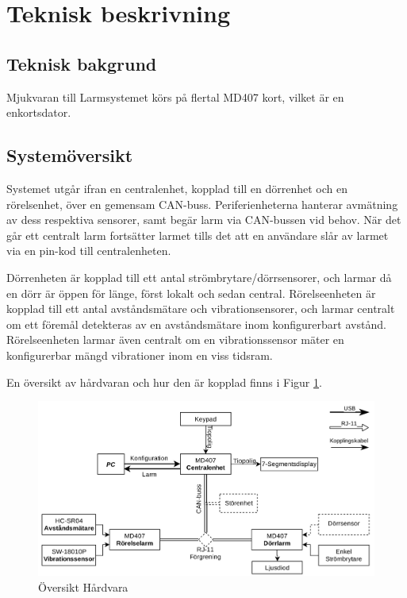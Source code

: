 \documentclass{article}
\begin{document}
\section{Teknisk beskrivning} %
\subsection{Teknisk bakgrund}
Mjukvaran till Larmsystemet körs på flertal MD407 kort, vilket är en
enkortsdator.
\subsection{Systemöversikt}

Systemet utgår ifran en centralenhet, kopplad till en dörrenhet och en rörelsenhet, över en gemensam CAN-buss. Periferienheterna hanterar avmätning av dess respektiva sensorer, samt begär larm via CAN-bussen vid behov. När det går ett centralt larm fortsätter larmet tills det att en användare slår av larmet via en pin-kod till centralenheten.

Dörrenheten är kopplad till ett antal strömbrytare/dörrsensorer, och larmar då en dörr är öppen för länge, först lokalt och sedan central.
Rörelseenheten är kopplad till ett antal avståndsmätare och vibrationsensorer, och larmar centralt om ett föremål detekteras av en avståndsmätare inom konfigurerbart avstånd. Rörelseenheten larmar även centralt om en vibrationssensor mäter en konfigurerbar mängd vibrationer inom en viss tidsram. %

En översikt av hårdvaran och hur den är kopplad finns i Figur \ref{fig:hårdvara}.
\begin{figure}[H] %
    \centering
    \includegraphics[width=1\textwidth]{figurer/HardvaraOversikt.jpg}
    \caption{Översikt Hårdvara}
    \label{fig:hårdvara}
\end{figure}
\end{document}

